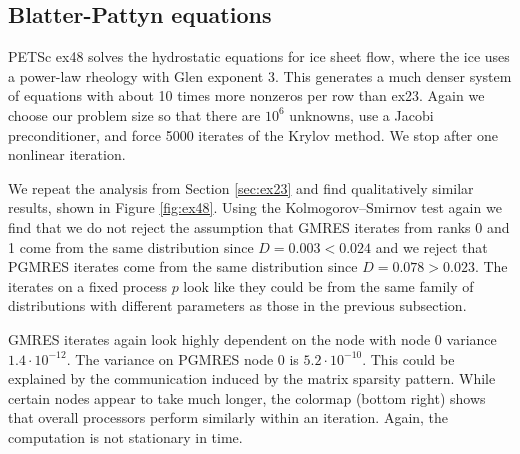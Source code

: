 \documentclass[num-refs]{wiley-article}
\begin{document}
\subsection{Blatter-Pattyn equations}
PETSc ex48 solves the hydrostatic equations for ice sheet flow, where the ice uses a power-law rheology with Glen exponent 3. This generates a much denser system of equations with about 10 times more nonzeros per row than ex23. Again we choose our problem size so that there are $10^6$ unknowns, use a Jacobi preconditioner, and force 5000 iterates of the Krylov method. We stop after one nonlinear iteration. 

We repeat the analysis from Section \ref{sec:ex23} and find qualitatively similar results, shown in Figure \ref{fig:ex48}. Using the Kolmogorov–Smirnov test again we find that we do not reject the assumption that GMRES iterates from ranks 0 and 1 come from the same distribution since $D = 0.003 < 0.024$ and we reject that PGMRES iterates come from the same distribution since $D = 0.078 > 0.023$.
The iterates on a fixed process $p$ look like they could be from the same family of distributions with different parameters as those in the previous subsection. 

GMRES iterates again look highly dependent on the node with node 0 variance $1.4\cdot10^{-12}$. The variance on PGMRES node 0 is $5.2\cdot10^{-10}$. This could be explained by the communication induced by the matrix sparsity pattern. While certain nodes appear to take much longer, the colormap (bottom right) shows that overall processors perform similarly within an iteration. Again, the computation is  not stationary in time. 
\end{document}
